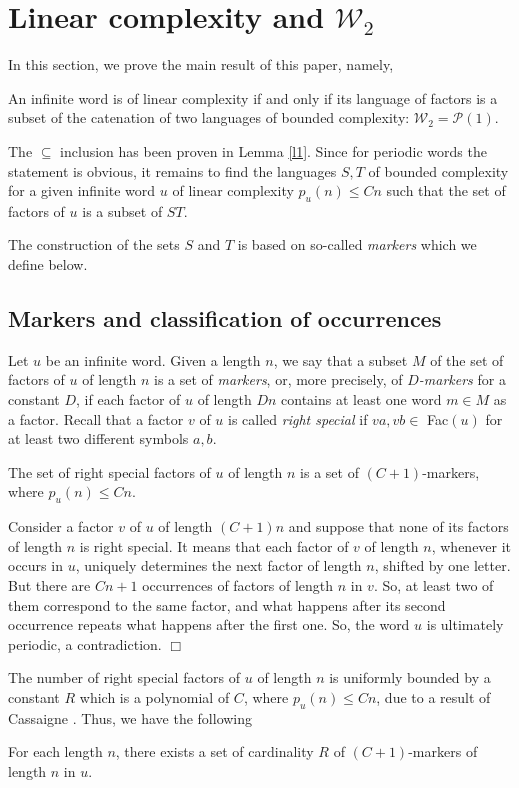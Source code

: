\documentclass[runningheads,envcountsect,envcountsame]{llncs}
\begin{document}
\section{Linear complexity and $\mathcal W_2$}
In this section, we prove the main result of this paper, namely,
\begin{theorem}\label{t:w2} An infinite word is of linear complexity if and only if its language of factors is a subset of the catenation of two languages of bounded complexity:
 $\mathcal W_2=\mathcal P(1)$.
\end{theorem}
The $\subseteq$ inclusion has been proven in Lemma \ref{l1}.
Since for periodic words the statement is obvious, it remains
to find the languages $S,T$ of bounded complexity for a given infinite word $u$ of
linear complexity $p_u(n)\leq Cn$ such that the set of factors of $u$ is a subset of $ST$.

The construction of the sets  $S$ and $T$ is based on so-called {\it markers} which we define below.

\subsection{Markers and classification of occurrences}
Let $u$ be an infinite word. Given a length $n$, we say that a
subset $M$ of the set of factors of $u$ of length $n$ is a set of
{\it markers}, or, more precisely, of {\it $D$-markers} for a
constant $D$, if each factor of $u$ of length $Dn$ contains at
least one word $m \in M$ as a factor. 
Recall that a factor $v$ of $u$ is called {\it right special} if $va, vb \in$ Fac$(u)$ for at least two different symbols $a,b$.
\begin{lemma}
The set of right special factors of $u$ of length $n$ is a set of $(C+1)$-markers, where $p_u(n)\leq Cn$.
\end{lemma}
 Consider a factor $v$ of $u$ of length $(C+1)n$ and suppose that none of its factors of length $n$ is right special. It means that each factor of $v$ of length $n$, whenever it occurs in $u$, uniquely determines the next factor of length $n$, shifted by one letter. But there are $Cn+1$ occurrences of factors of length $n$ in $v$. So, at least two of them correspond to the same factor, and what happens after its second occurrence repeats what happens after the first one. So, the word $u$ is ultimately periodic, a contradiction.  \hfill $\Box$

\medskip
The number of right special factors of $u$ of length $n$ is
uniformly bounded by a constant $R$ which is a polynomial of $C$,
where $p_u(n)\leq Cn$, due to a result of Cassaigne
\cite{cas_lin,cas_livre}. Thus, we have the following 
\begin{corollary}\label{c:mark}
 For each length $n$, there exists a set of cardinality $R$ of $(C+1)$-markers of length $n$ in $u$.
\end{corollary}
\end{document}
